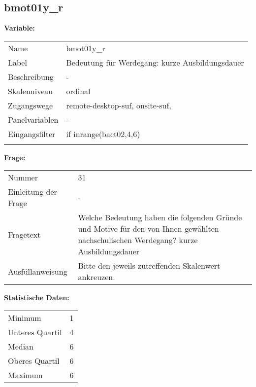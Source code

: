 	
	
	\subsection{bmot01y\_r}
	\label{subSection:bmot01y_r}

	\noindent\textbf{Variable:}\\
		\begin{tabular}{lL{11.3cm}}
			\label{tableVariable:bmot01y_r}
			Name & bmot01y\_r \\
			Label & Bedeutung für Werdegang: kurze Ausbildungsdauer \\
			Beschreibung & - \\
			Skalenniveau & ordinal \\
			Zugangswege &
				remote-desktop-suf,
				onsite-suf,
 \\
			Panelvariablen & -
			 \\
			Eingangsfilter & if inrange(bact02,4,6)  \\
 \\
		\end{tabular}

		\vspace*{1 cm}
		\noindent\textbf{Frage:}\\
		\begin{tabular}{lL{11.3cm}}
			\label{tableQuestion:bmot01y_r}
			Nummer & 31 \\
			Einleitung der Frage & - \\
			Fragetext & Welche Bedeutung haben die folgenden Gründe und Motive für den von Ihnen gewählten nachschulischen Werdegang?
kurze Ausbildungsdauer \\
			Ausfüllanweisung & Bitte den jeweils zutreffenden Skalenwert ankreuzen. \\
		\end{tabular}


		\vspace*{1 cm}
		\noindent\textbf{Statistische Daten:}\\
			\begin{tabular}{ll}
				\label{tableStatistics:bmot01y_r}
					Minimum & 1 \\
					Unteres Quartil & 4 \\
					Median & 6 \\
					Oberes Quartil & 6 \\
					Maximum & 6 \\
			\end{tabular}



